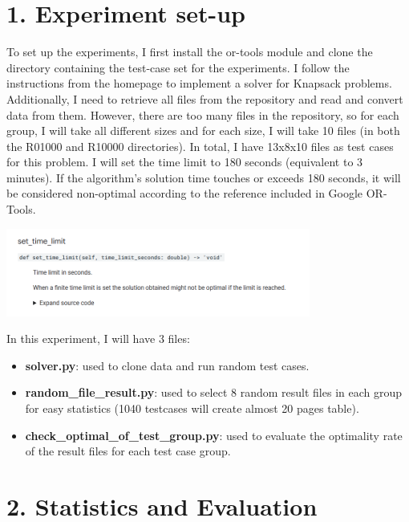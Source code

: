 \documentclass[english, a4paper,12pt]{article}
\begin{document}
\section*{1. Experiment set-up}
\hspace*{7mm}To set up the experiments, I first install the or-tools module and clone the directory containing the test-case set for the experiments. I follow the instructions from the homepage to implement a solver for Knapsack problems. Additionally, I need to retrieve all files from the repository and read and convert data from them. However, there are too many files in the repository, so for each group, I will take all different sizes and for each size, I will take 10 files (in both the R01000 and R10000 directories). In total, I have 13x8x10 files as test cases for this problem. I will set the time limit to 180 seconds (equivalent to 3 minutes). If the algorithm’s solution time touches or exceeds 180 seconds, it will be considered non-optimal according to the reference included in Google OR-Tools.
\begin{center}
\includegraphics[width=10cm]{image.png}
\end{center}

\hspace*{7mm} In this experiment, I will have 3 files: 
\begin{itemize}
\item \textbf{solver.py}: used to clone data and run random test cases.
\item\textbf{random\_file\_result.py}: used to select 8 random result files in each group for easy statistics (1040 testcases will create almost 20 pages table).
\item 
\textbf{check\_optimal\_of\_test\_group.py}: used to evaluate the optimality rate of the result files for each test case group.
\end{itemize}


\section*{2. Statistics and Evaluation}
\end{document}
